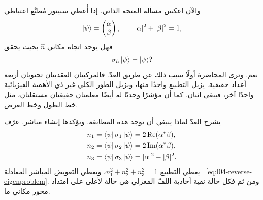 والآن اعكس مسألة المتجه الذاتي. إذا أُعطي سبينور مُطبَّع اعتباطي
\begin{equation}
  \left\lvert\psi\right\rangle=
  \begin{pmatrix}\alpha\\\beta\end{pmatrix},
  \qquad
  |\alpha|^2+|\beta|^2=1,
  \label{eq:l04-general-spinor}
\end{equation}
فهل يوجد اتجاه مكاني \(\hat n\) بحيث يحقق
\begin{equation}
  \sigma_{\hat n}\left\lvert\psi\right\rangle=\left\lvert\psi\right\rangle?
  \label{eq:l04-reverse-eigenproblem}
\end{equation}
نعم. وترى المحاضرة أولًا سبب ذلك عن طريق العدّ. فالمركبتان العقديتان تحتويان أربعة أعداد حقيقية. يزيل التطبيع واحدًا منها، ويزيل الطور الكلي غير ذي الأهمية الفيزيائية واحدًا آخر، فيبقى اثنان. كما أن مؤشرًا وحديًا له أيضًا معلمتان حقيقتان مستقلتان، مثل خط الطول وخط العرض.

\begin{classroomqa}
\end{classroomqa}

\begin{classroomqa}
\end{classroomqa}

يشرح العدّ لماذا ينبغي أن توجد هذه المطابقة. ويؤكدها إنشاء مباشر. عرّف
\begin{align}
  n_1&=\left\langle\psi\right\rvert\sigma_1\left\lvert\psi\right\rangle
      =2\operatorname{Re}(\alpha^*\beta),
  \notag\\
  n_2&=\left\langle\psi\right\rvert\sigma_2\left\lvert\psi\right\rangle
      =2\operatorname{Im}(\alpha^*\beta),
  \notag\\
  n_3&=\left\langle\psi\right\rvert\sigma_3\left\lvert\psi\right\rangle
      =|\alpha|^2-|\beta|^2.
  \label{eq:l04-bloch-components}
\end{align}
يعطي التطبيع \(n_1^2+n_2^2+n_3^2=1\)، ويعطي التعويض المباشر المعادلة ~\eqref{eq:l04-reverse-eigenproblem}. ومن ثم فكل حالة نقية أحادية اللفّ المغزلي هي حالة لأعلى على امتداد محور مكاني ما.


